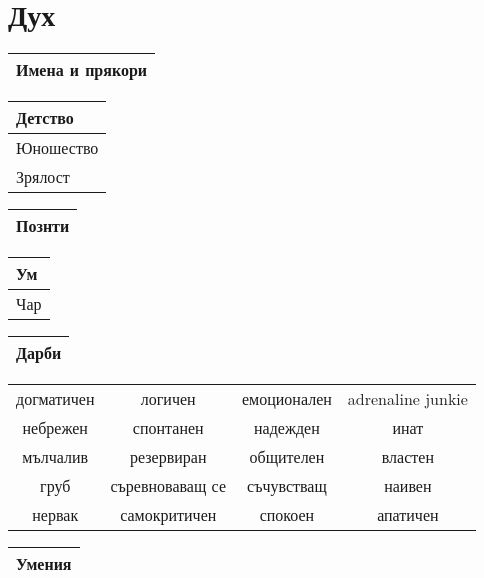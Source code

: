 \documentclass{article}
\begin{document}
\section{Дух}
\extrarowsep=0.5cm
\noindent
\begin{tabular}{|p{\textwidth}|}
\hline
{\tiny Имена и прякори}  \\
\hline
\end{tabular}

\begin{multicols}{2}
\extrarowsep=3cm
\noindent
\begin{tabular}{|p{}|}
\hline
{\tiny Детство}  \\
\hline
{\tiny Юношество}  \\
\hline
{\tiny Зрялост}  \\
\hline
\end{tabular}

\extrarowsep=10cm
\noindent
\begin{tabular}{|p{}|}
\hline
{\tiny Познти}  \\
\hline
\end{tabular}
\end{multicols}

\begin{multicols}{2}
\extrarowsep=1cm
\begin{tabular}{|p{2cm}|}
\hline
{\tiny Ум}  \\
\hline
{\tiny Чар}  \\
\hline
\end{tabular}

\extrarowsep=4cm
\begin{tabular}{|p{4cm}|}
\hline
{\tiny Дарби}  \\
\hline
\end{tabular}

\begin{tiny}
\extrarowsep=0.5cm
\noindent
\begin{tabular}{|c c c c|}
\hline
догматичен & логичен & емоционален & adrenaline junkie  \\
небрежен & спонтанен & надежден & инат  \\
мълчалив & резервиран & общителен & властен  \\
груб & съревноваващ се & съчувстващ & наивен  \\
нервак & самокритичен & спокоен & апатичен  \\
\hline
\end{tabular}
\end{tiny}

\extrarowsep=13cm
\noindent
\begin{tabular}{|p{6cm}|}
\hline
{\tiny Умения}  \\
\hline
\end{tabular}
\end{multicols}
\end{document}
